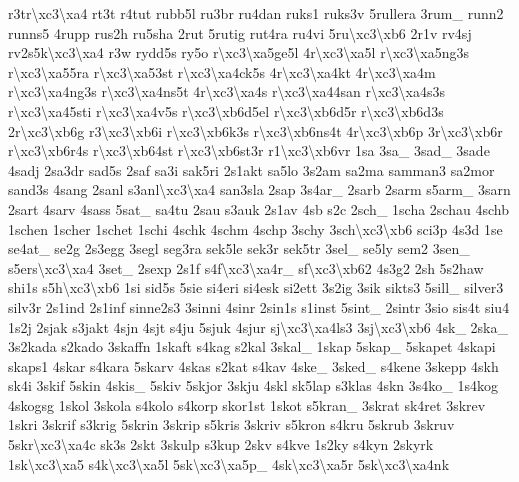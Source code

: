 \begin{DoxyCompactItemize}
r3tr\textbackslash{}xc3\textbackslash{}xa4 rt3t r4tut rubb5l ru3br ru4dan ruks1 ruks3v 5rullera 3rum\-\_\- runn2 runns5 4rupp rus2h ru5sha 2rut 5rutig rut4ra ru4vi 5ru\textbackslash{}xc3\textbackslash{}xb6 2r1v rv4sj rv2s5k\textbackslash{}xc3\textbackslash{}xa4 r3w rydd5s ry5o r\textbackslash{}xc3\textbackslash{}xa5ge5l 4r\textbackslash{}xc3\textbackslash{}xa5l r\textbackslash{}xc3\textbackslash{}xa5ng3s r\textbackslash{}xc3\textbackslash{}xa55ra r\textbackslash{}xc3\textbackslash{}xa53st r\textbackslash{}xc3\textbackslash{}xa4ck5s 4r\textbackslash{}xc3\textbackslash{}xa4kt 4r\textbackslash{}xc3\textbackslash{}xa4m r\textbackslash{}xc3\textbackslash{}xa4ng3s r\textbackslash{}xc3\textbackslash{}xa4ns5t 4r\textbackslash{}xc3\textbackslash{}xa4s r\textbackslash{}xc3\textbackslash{}xa44san r\textbackslash{}xc3\textbackslash{}xa4s3s r\textbackslash{}xc3\textbackslash{}xa45sti r\textbackslash{}xc3\textbackslash{}xa4v5s r\textbackslash{}xc3\textbackslash{}xb6d5el r\textbackslash{}xc3\textbackslash{}xb6d5r r\textbackslash{}xc3\textbackslash{}xb6d3s 2r\textbackslash{}xc3\textbackslash{}xb6g r3\textbackslash{}xc3\textbackslash{}xb6i r\textbackslash{}xc3\textbackslash{}xb6k3s r\textbackslash{}xc3\textbackslash{}xb6ns4t 4r\textbackslash{}xc3\textbackslash{}xb6p 3r\textbackslash{}xc3\textbackslash{}xb6r r\textbackslash{}xc3\textbackslash{}xb6r4s r\textbackslash{}xc3\textbackslash{}xb64st r\textbackslash{}xc3\textbackslash{}xb6st3r r1\textbackslash{}xc3\textbackslash{}xb6vr 1sa 3sa\-\_\- 3sad\-\_\- 3sade 4sadj 2sa3dr sad5s 2saf sa3i sak5ri 2s1akt sa5lo 3s2am sa2ma samman3 sa2mor sand3s 4sang 2sanl s3anl\textbackslash{}xc3\textbackslash{}xa4 san3sla 2sap 3s4ar\-\_\- 2sarb 2sarm s5arm\-\_\- 3sarn 2sart 4sarv 4sass 5sat\-\_\- sa4tu 2sau s3auk 2s1av 4sb s2c 2sch\-\_\- 1scha 2schau 4schb 1schen 1scher 1schet 1schi 4schk 4schm 4schp 3schy 3sch\textbackslash{}xc3\textbackslash{}xb6 sci3p 4s3d 1se se4at\-\_\- se2g 2s3egg 3segl seg3ra sek5le sek3r sek5tr 3sel\-\_\- se5ly sem2 3sen\-\_\- s5ers\textbackslash{}xc3\textbackslash{}xa4 3set\-\_\- 2sexp 2s1f s4f\textbackslash{}xc3\textbackslash{}xa4r\-\_\- sf\textbackslash{}xc3\textbackslash{}xb62 4s3g2 2sh 5s2haw shi1s s5h\textbackslash{}xc3\textbackslash{}xb6 1si sid5s 5sie si4eri si4esk si2ett 3s2ig 3sik sikts3 5sill\-\_\- silver3 silv3r 2s1ind 2s1inf sinne2s3 3sinni 4sinr 2sin1s s1inst 5sint\-\_\- 2sintr 3sio sis4t siu4 1s2j 2sjak s3jakt 4sjn 4sjt s4ju 5sjuk 4sjur sj\textbackslash{}xc3\textbackslash{}xa4ls3 3sj\textbackslash{}xc3\textbackslash{}xb6 4sk\-\_\- 2ska\-\_\- 3s2kada s2kado 3skaffn 1skaft s4kag s2kal 3skal\-\_\- 1skap 5skap\-\_\- 5skapet 4skapi skaps1 4skar s4kara 5skarv 4skas s2kat s4kav 4ske\-\_\- 3sked\-\_\- s4kene 3skepp 4skh sk4i 3skif 5skin 4skis\-\_\- 5skiv 5skjor 3skju 4skl sk5lap s3klas 4skn 3s4ko\-\_\- 1s4kog 4skogsg 1skol 3skola s4kolo s4korp skor1st 1skot s5kran\-\_\- 3skrat sk4ret 3skrev 1skri 3skrif s3krig 5skrin 3skrip s5kris 3skriv s5kron s4kru 5skrub 3skruv 5skr\textbackslash{}xc3\textbackslash{}xa4c sk3s 2skt 3skulp s3kup 2skv s4kve 1s2ky s4kyn 2skyrk 1sk\textbackslash{}xc3\textbackslash{}xa5 s4k\textbackslash{}xc3\textbackslash{}xa5l 5sk\textbackslash{}xc3\textbackslash{}xa5p\-\_\- 4sk\textbackslash{}xc3\textbackslash{}xa5r 5sk\textbackslash{}xc3\textbackslash{}xa4nk 
\end{DoxyCompactItemize}
